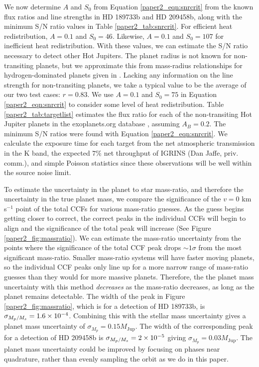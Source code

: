 We now determine $A$ and $S_0$ from Equation \ref{paper2_eqn:snrcrit} from the known flux ratios and line strengths in HD 189733b and HD 209458b, along with the minimum S/N ratio values in Table \ref{paper2_tab:snrcrit}. For efficient heat redistribution, $A=0.1$ and $S_0 = 46$. Likewise, $A=0.1$ and $S_0 = 107$ for inefficient heat redistribution. With these values, we can estimate the S/N ratio necessary to detect other Hot Jupiters. The planet radius is not known for non-transiting planets, but we approximate this from mass-radius relationships for hydrogen-dominated planets given in \cite{Swift2012}. Lacking any information on the line strength for non-transiting planets, we take a typical value to be the average of our two test cases: $r = 0.83$. We use $A=0.1$ and $S_0=75$ in Equation \ref{paper2_eqn:snrcrit} to consider some level of heat redistribution. Table \ref{paper2_tab:targetlist} estimates the flux ratio for each of the non-transiting Hot Jupiter planets in the exoplanets.org database \citep{exoplanet}, assuming $A_B = 0.2$. The minimum S/N ratios were found with Equation \ref{paper2_eqn:snrcrit}. We calculate the exposure time for each target from the net atmospheric transmission in the K band, the expected $7\%$ net throughput of IGRINS (Dan Jaffe, priv. comm.), and simple Poisson statistics since these observations will be well within the source noise limit.

To estimate the uncertainty in the planet to star mass-ratio, and therefore the uncertainty in the true planet mass, we compare the significance of the $v=0$ km s$^{-1}$ point of the total CCFs for various mass-ratio guesses. As the guess begins getting closer to correct, the correct peaks in the individual CCFs will begin to align and the significance of the total peak will increase (See Figure \ref{paper2_fig:massratio}). We can estimate the mass-ratio uncertainty from the points where the significance of the total CCF peak drops $\sim 1 \sigma$ from the most significant mass-ratio. Smaller mass-ratio systems will have faster moving planets, so the individual CCF peaks only line up for a more narrow range of mass-ratio guesses than they would for more massive planets. Therefore, the the planet mass uncertainty with this method \emph{decreases} as the mass-ratio decreases, as long as the planet remains detectable. The width of the peak in Figure \ref{paper2_fig:massratio}, which is for a detection of HD 189733b, is $\sigma_{M_p/M_s} = 1.6\times 10^{-4}$. Combining this with the stellar mass uncertainty gives a planet mass uncertainty of $\sigma_{M_p} = 0.15 M_\mathrm{ Jup}$. The width of the corresponding peak for a detection of HD 209458b is $\sigma_{M_p/M_s} = 2\times 10^{-5}$ giving $\sigma_{M_p} = 0.03 M_\mathrm{ Jup}$. The planet mass uncertainty could be improved by focusing on phases near quadrature, rather than evenly sampling the orbit as we do in this paper.



